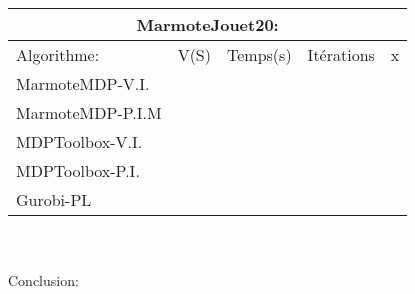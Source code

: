 \documentclass{article}
\begin{document}
\begin{tabular}{ |p{3.5cm}||p{3.5cm}|p{2cm}|p{2cm}|p{1cm}| }
 \hline
 \multicolumn{5}{|c|}{\textbf{MarmoteJouet20:}} \\
 \hline
   Algorithme: & V(S) & Temps(s) & Itérations & x\\
 \hline
 MarmoteMDP-V.I. & & & & \\
 MarmoteMDP-P.I.M & &  & & \\
 MDPToolbox-V.I. & &  & & \\
 MDPToolbox-P.I. &  &  &  & \\
 Gurobi-PL &  &  &  & \\
 \hline
\end{tabular}\\\\

Conclusion: 
\end{document}
